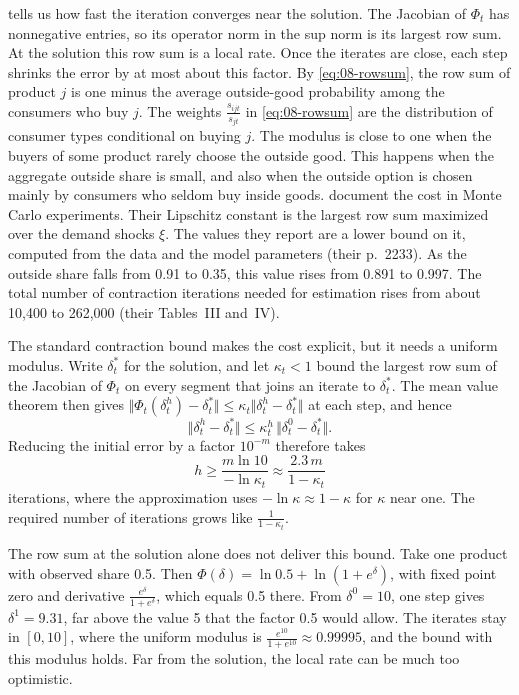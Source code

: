  tells us how fast the iteration converges near the solution. The Jacobian of $\Phi_t$ has
nonnegative entries, so its operator norm in the sup norm is its largest row sum. At the solution this row sum is
a local rate. Once the iterates are close, each step shrinks the error by at most about this factor. By
\eqref{eq:08-rowsum}, the row sum of product $j$ is one minus
the average outside-good probability among the consumers who buy $j$. The weights $\frac{s_{ijt}}
{s_{jt}}$ in \eqref{eq:08-rowsum} are the distribution of consumer types conditional on buying $j$. The
modulus is close to one when the buyers of some product rarely choose the outside good. This happens when the
aggregate outside share is small, and also when the outside option is chosen mainly by consumers who seldom
buy inside goods. \citet[Section~7]{DubeFoxSu2012} document the cost in Monte Carlo experiments. Their
Lipschitz constant is the largest row sum maximized over the demand shocks $\xi$. The values they report are a
lower bound on it, computed from the data and the model parameters (their p.~2233). As the outside share falls
from 0.91 to 0.35, this value rises from 0.891 to 0.997. The total number of contraction iterations needed for estimation rises from about 10,400 to 262,000 (their Tables~III
and~IV).

The standard contraction bound makes the cost explicit, but it needs a uniform modulus. Write $\delta^*_t$
for the solution, and let $\kappa_t < 1$ bound the largest row sum of the Jacobian of $\Phi_t$ on every segment
that joins an iterate to $\delta^*_t$. The mean value theorem then gives $\Vert \Phi_t(\delta^h_t) -
\delta^*_t\Vert \leq \kappa_t\Vert \delta^h_t - \delta^*_t\Vert$ at each step, and hence
\begin{equation*}
  \Vert \delta^h_t - \delta^*_t\Vert \leq \kappa_t^h\, \Vert \delta^0_t - \delta^*_t\Vert.
\end{equation*}
Reducing the initial error by a factor $10^{-m}$ therefore takes
\begin{equation*}
  h \geq \frac{m\ln 10}{-\ln\kappa_t} \approx \frac{2.3\, m}{1 - \kappa_t}
\end{equation*}
iterations, where the approximation uses $-\ln\kappa \approx 1 - \kappa$ for $\kappa$ near one. The
required number of iterations grows like $\frac{1}{1 - \kappa_t}$.

The row sum at the solution alone does not deliver this bound. Take one product with observed share 0.5.
Then $\Phi(\delta) = \ln 0.5 + \ln(1 + e^{\delta})$, with fixed point zero and derivative $\frac{e^{\delta}}{1 +
e^{\delta}}$, which equals 0.5 there. From $\delta^0 = 10$, one step gives $\delta^1 = 9.31$, far above the value
5 that the factor 0.5 would allow. The iterates stay in $[0, 10]$, where the uniform modulus is $\frac{e^{10}}{1
+ e^{10}} \approx 0.99995$, and the bound with this modulus holds. Far from the solution, the local rate can be
much too optimistic.

